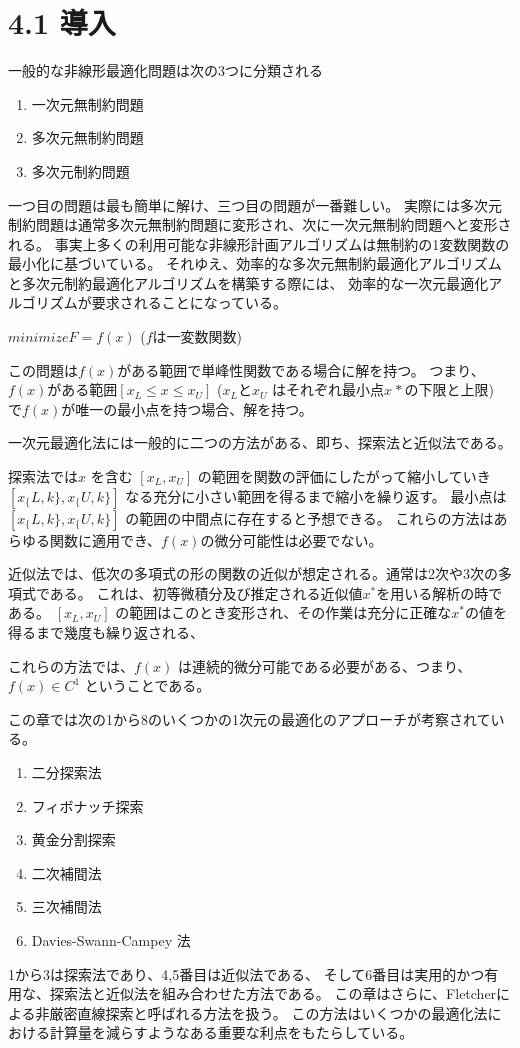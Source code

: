 \section*{4.1 導入}\label{4-1-}

一般的な非線形最適化問題は次の3つに分類される

\begin{enumerate}
\tightlist
\item
  一次元無制約問題
\item
  多次元無制約問題
\item
  多次元制約問題
\end{enumerate}

一つ目の問題は最も簡単に解け、三つ目の問題が一番難しい。
実際には多次元制約問題は通常多次元無制約問題に変形され、次に一次元無制約問題へと変形される。
事実上多くの利用可能な非線形計画アルゴリズムは無制約の1変数関数の最小化に基づいている。
それゆえ、効率的な多次元無制約最適化アルゴリズムと多次元制約最適化アルゴリズムを構築する際には、
効率的な一次元最適化アルゴリズムが要求されることになっている。

$ minimize F = f(x) $ ($f$は一変数関数)

この問題は$f(x)$がある範囲で単峰性関数である場合に解を持つ。
つまり、$ f(x) $がある範囲$ [x_L \leq x
\leq x_U] $ ($ x_L $と$ x_U $
はそれぞれ最小点$ x^{}* $の下限と上限) で$ f(x)
$が唯一の最小点を持つ場合、解を持つ。

一次元最適化法には一般的に二つの方法がある、即ち、探索法と近似法である。

探索法では$ x $ を含む $ [x_L , x_U] $
の範囲を関数の評価にしたがって縮小していき $ [ x_\{L,k\} ,
x_\{U,k\} ] $ なる充分に小さい範囲を得るまで縮小を繰り返す。
最小点は $ [ x_\{L,k\} , x_\{U,k\} ] $
の範囲の中間点に存在すると予想できる。
これらの方法はあらゆる関数に適用でき、$ f(x)
$の微分可能性は必要でない。

近似法では、低次の多項式の形の関数の近似が想定される。通常は2次や3次の多項式である。
これは、初等微積分及び推定される近似値$ x^*
$を用いる解析の時である。 $[ x_L , x_U ] $
の範囲はこのとき変形され、その作業は充分に正確な$ x^*
$の値を得るまで幾度も繰り返される、

これらの方法では、$ f(x) $
は連続的微分可能である必要がある、つまり、 $ f(x) \in
C^1 $ ということである。

この章では次の1から8のいくつかの1次元の最適化のアプローチが考察されている。

\begin{enumerate}
\tightlist
\item
  二分探索法
\item
  フィボナッチ探索
\item
  黄金分割探索
\item
  二次補間法
\item
  三次補間法
\item
  Davies-Swann-Campey 法
\end{enumerate}

1から3は探索法であり、4,5番目は近似法である、
そして6番目は実用的かつ有用な、探索法と近似法を組み合わせた方法である。
この章はさらに、Fletcherによる非厳密直線探索と呼ばれる方法を扱う。
この方法はいくつかの最適化法における計算量を減らすようなある重要な利点をもたらしている。
